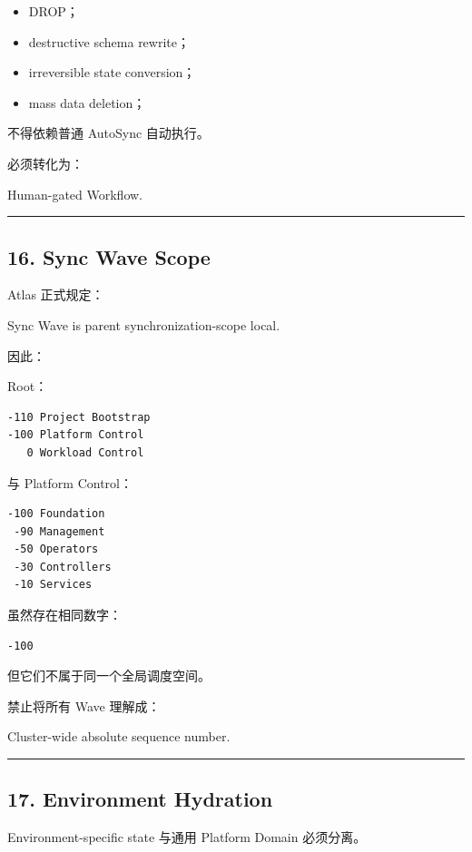 \documentclass[11pt,a4paper]{article}
\begin{document}
\begin{itemize}
  \item DROP；
  \item destructive schema rewrite；
  \item irreversible state conversion；
  \item mass data deletion；
\end{itemize}
不得依赖普通 AutoSync 自动执行。

必须转化为：

\begin{gfmBlockquote}
Human-gated Workflow.
\end{gfmBlockquote}
\vspace{0.5em}\hrule\vspace{0.5em}
\subsection{16. Sync Wave Scope}
Atlas 正式规定：

\begin{gfmBlockquote}
Sync Wave is parent synchronization-scope local.
\end{gfmBlockquote}
因此：

Root：

\begin{lstlisting}[language=text]
-110 Project Bootstrap
-100 Platform Control
   0 Workload Control
\end{lstlisting}
与 Platform Control：

\begin{lstlisting}[language=text]
-100 Foundation
 -90 Management
 -50 Operators
 -30 Controllers
 -10 Services
\end{lstlisting}
虽然存在相同数字：

\begin{lstlisting}[language=text]
-100
\end{lstlisting}
但它们不属于同一个全局调度空间。

禁止将所有 Wave 理解成：

\begin{gfmBlockquote}
Cluster-wide absolute sequence number.
\end{gfmBlockquote}
\vspace{0.5em}\hrule\vspace{0.5em}
\subsection{17. Environment Hydration}
Environment-specific state 与通用 Platform Domain 必须分离。
\end{document}
